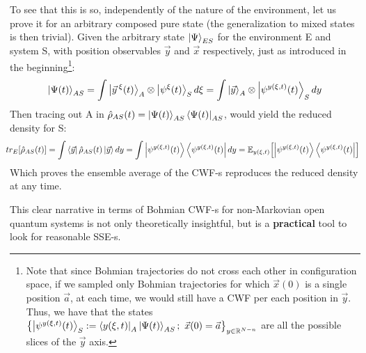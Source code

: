\documentclass[11pt, a4paper]{article} %
\newcommand{\R}{\mathbb{R}} %
\begin{document}
To see that this is so, independently of the nature of the environment, let us prove it for an arbitrary composed pure state (the generalization to mixed states is then trivial). Given the arbitrary state $\ket{\Psi}_{ES}$ for the environment E and system S, with position observables $\vec{y}$ and $\vec{x}$ respectively, just as introduced in the beginning\footnote{Note that since Bohmian trajectories do not cross each other in configuration space, if we sampled only Bohmian trajectories for which $\vec{x}(0)$ is a single position $\vec{a}$, at each time, we would still have a CWF per each position in $\vec{y}$. Thus, we have that the states $\qty{\ket{\psi^{y(\xi,t)}(t)}_S:=\bra{y(\xi,t)}_A\ket{\Psi(t)}_{AS};\ \vec{x}(0)=\vec{a}}_{y\in\R^{N-n}}$ are all the possible slices of the $\vec{y}$ axis.}:\vspace{-0.2cm}
\begin{equation}
\ket{\Psi(t)}_{AS}=\int\ket{\vec{y}^{\:\xi}(t)}_A\otimes \ket{\psi^\xi(t)}_S d\xi = \int\ket{\vec{y}}_A\otimes \ket{\psi^{y(\xi,t)}(t)}_S dy
\end{equation}
Then tracing out A in $\hat{\rho}_{AS}(t)=\ket{\Psi(t)}_{AS}\bra{\Psi(t)}_{AS}$, would yield the reduced density for S:
\begin{equation}\hspace{-0.2cm}
tr_E\qty[\hat{\rho}_{AS}(t)] = \int\bra{\vec{y}}\hat{\rho}_{AS}(t)\ket{\vec{y}}dy = \int \ket{\psi^{y(\xi,t)}(t)}\bra{\psi^{y(\xi,t)}(t)} dy = \mathbb{E}_{y(\xi,t)}\qty[\ket{\psi^{y(\xi,t)}(t)}\bra{\psi^{y(\xi,t)}(t)}]
\end{equation}
Which proves the ensemble average of the CWF-s reproduces the reduced density at any time.\vspace{-0.15cm}

This clear narrative in terms of Bohmian CWF-s for non-Markovian open quantum systems is not only theoretically insightful, but is a {\bf practical} tool to look for reasonable SSE-s. \vspace{-0.2cm}
\end{document}

